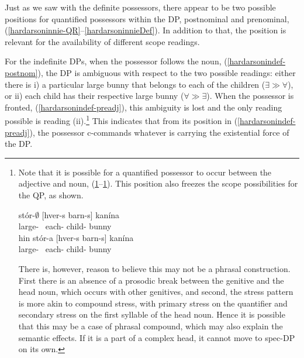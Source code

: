 \documentclass[output=paper,colorlinks,citecolor=brown,
]{langscibook}
\begin{document}
Just as we saw with the definite possessors, there appear to be two possible positions for quantified possessors within the DP, postnominal and prenominal, (\ref{hardarsoninnie-QR}--\ref{hardarsoninnieDef}). In addition to that, the position is relevant for the availability of different scope readings.

For the indefinite DPs, when the possessor follows the noun, (\ref{hardarsonindef-postnom}), the DP is ambiguous with respect to the two possible readings: either there is i) a particular large bunny that belongs to each of the children ($\exists \gg \forall$), or ii) each child has their respective large bunny ($\forall \gg \exists$). When the possessor is fronted, (\ref{hardarsonindef-preadj}), this ambiguity is lost and the only reading possible is reading (ii).\footnote{
Note that it is possible for a quantified possessor to occur between the adjective and noun, (\ref{hardarsonindef-postadj}--\ref{hardarsondef-postadj}). This position also freezes the scope possibilities for the QP, as shown.

\begin{exe}
\settowidth{}
	\ex	\gll	stór-$\emptyset$ [hver-s barn-s] kanína \label{hardarsonindef-postadj}\\
					large-{\hardStr} ~each-{\hardGen} child-{\hardGen} bunny\\ \jambox{$\exists \gg \forall$; *$\forall \gg \exists$}
			\glt
		\ex	\gll	hin stór-a [hver-s barn-s] kanína \label{hardarsondef-postadj}\\
						{\hardArt} large-{\hardWk} ~each-{\hardGen} child-{\hardGen} bunny\\ 
				\glt
\end{exe}

There is, however, reason to believe this may not be a phrasal construction. First there is an absence of a prosodic break between the genitive and the head noun, which occurs with other genitives, and second, the stress pattern is more akin to compound stress, with primary stress on the quantifier and secondary stress on the first syllable of the head noun. Hence it is possible that this may be a case of phrasal compound, which may also explain the semantic effects. If it is a part of a complex head, it cannot move to spec-DP on its own.}
This indicates that from its position in (\ref{hardarsonindef-preadj}), the possessor c-commands whatever is carrying the existential force of the DP.
\end{document}
